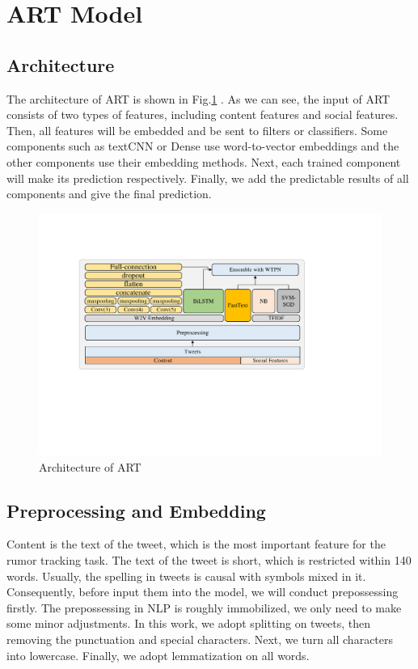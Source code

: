 \section{ART Model}
\label{sec:model}

\subsection{Architecture}
\label{sec:architecture}
The architecture of ART is shown in Fig.\ref{fig:architecture} . As we can see, the input of  ART consists of two types of features, including content features and social features. Then, all features will be embedded and be sent to filters or classifiers.  Some components such as textCNN or Dense use word-to-vector embeddings and the other components use their embedding methods. Next, each trained component will make its prediction respectively. Finally, we add the predictable results of all components and give the final prediction. 

\begin{figure}[tbp]
	\hspace{0ex}
	\vspace{0ex}
	\centering
	\includegraphics[width = \textwidth]{fig/structure}
	\caption{Architecture of ART}
	\label{fig:architecture}
\end{figure}

\subsection{Preprocessing and Embedding}
\label{sec:process_embedding}
Content is the text of the tweet, which is the most important feature for the rumor tracking task. The text of the tweet is short, which is restricted within 140 words. Usually, the spelling in tweets is causal with symbols mixed in it. Consequently, before input them into the model, we will conduct prepossessing firstly. The prepossessing in NLP is roughly immobilized, we only need to make some minor adjustments. In this work, we adopt splitting on tweets, then removing the punctuation and special characters. Next, we turn all characters into lowercase. Finally, we adopt lemmatization on all words.

